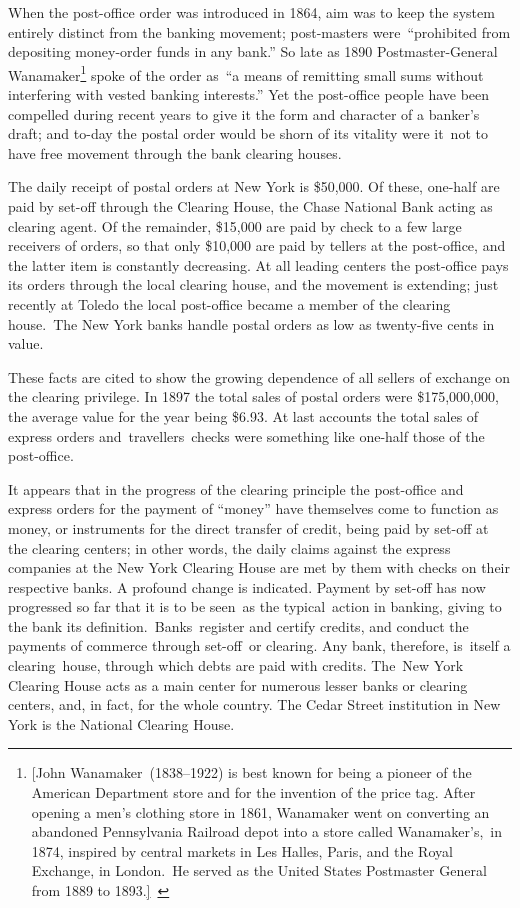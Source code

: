 \documentclass[twoside,symmetric,nobib,justified]{tufte-book}
\begin{document}
When the post-office order was introduced in 1864, aim was to keep the
system entirely distinct from the banking movement; post-masters
were~``prohibited from depositing money-order funds in any bank.'' So
late as 1890 Postmaster-General Wanamaker\footnote{{[}John
  Wanamaker~(1838--1922) is best known for being a pioneer of the
  American Department store and for the invention of the price tag.
  After opening a men's clothing store in 1861, Wanamaker went on
  converting an abandoned Pennsylvania Railroad depot into a store
  called Wanamaker's,~in 1874, inspired by central markets in Les
  Halles, Paris, and the Royal Exchange, in London.~He served as the
  United States Postmaster General from 1889 to
  1893.\href{applewebdata://D02306DF-3E46-4684-BD1A-1A323FFB2CB2\#_msocom_1}{{]}}~}
spoke of the order as~``a means of remitting small sums without
interfering with vested banking interests.'' Yet the post-office people
have been compelled during recent years to give it the form and
character of a banker's draft; and to-day the postal order would be
shorn of its vitality were it~not to have free movement through the bank
clearing houses. ~

The daily receipt of postal orders at New York is \$50,000. Of these,
one-half are paid by set-off through the Clearing House, the Chase
National Bank acting as clearing agent. Of the remainder, \$15,000 are
paid by check to a few large receivers of orders, so that only \$10,000
are paid by tellers at the post-office, and the latter item is
constantly decreasing. At all leading centers the post-office pays its
orders through the local clearing house, and the movement is extending;
just recently at Toledo the local post-office became a member of the
clearing house.~The New York banks handle postal orders as low as
twenty-five cents in value.~

These facts are cited to show the growing dependence of all sellers of
exchange on the clearing privilege. In 1897 the total sales of postal
orders were \$175,000,000, the average value for the year being \$6.93.
At last accounts the total sales of express orders and~travellers~checks
were something like one-half those of the post-office. ~

It appears that in the progress of the clearing principle the
post-office and express orders for the payment of ``money'' have
themselves come to function as money, or instruments for the direct
transfer of credit, being paid by set-off at the clearing centers; in
other words, the daily claims against the express companies at the New
York Clearing House are met by them with checks on their respective
banks. A profound change is indicated. Payment by set-off has now
progressed so far that it is to be seen~as the typical~action in
banking, giving to the bank its definition.~Banks~register and certify
credits, and conduct the payments of commerce through set-off~or
clearing. Any bank, therefore, is~itself a clearing~house, through which
debts are paid with credits. The~New York Clearing House acts as a main
center for numerous lesser banks or clearing centers, and, in fact, for
the whole country. The Cedar Street institution in New York is the
National Clearing House.~
\end{document}
